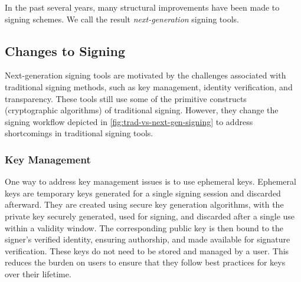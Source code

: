 \documentclass{IEEEcsmagTechrxiv}
\begin{document}
In the past several years, many structural improvements have been made to signing schemes.
We call the result \textit{next-generation} signing tools.

\subsection{Changes to Signing}
Next-generation signing tools are motivated by the challenges associated with traditional signing methods, such as key management, identity verification, and transparency.
These tools still use some of the primitive constructs (\eg cryptographic algorithms) of traditional signing.
However, they change the signing workflow depicted in \cref{fig:trad-vs-next-gen-signing} to address shortcomings in traditional signing tools.


\subsubsection{Key Management}
One way to address key management issues is to use ephemeral keys.
Ephemeral keys are temporary keys generated for a single signing session and discarded afterward.
They are created using secure key generation algorithms, with the private key securely generated, used for signing, and discarded after a single use within a validity window.
The corresponding public key is then bound to the signer’s verified identity, ensuring authorship, and made available for signature verification.
These keys do not need to be stored and managed by a user.
This reduces the burden on users to ensure that they follow best practices for keys over their lifetime.
\end{document}
